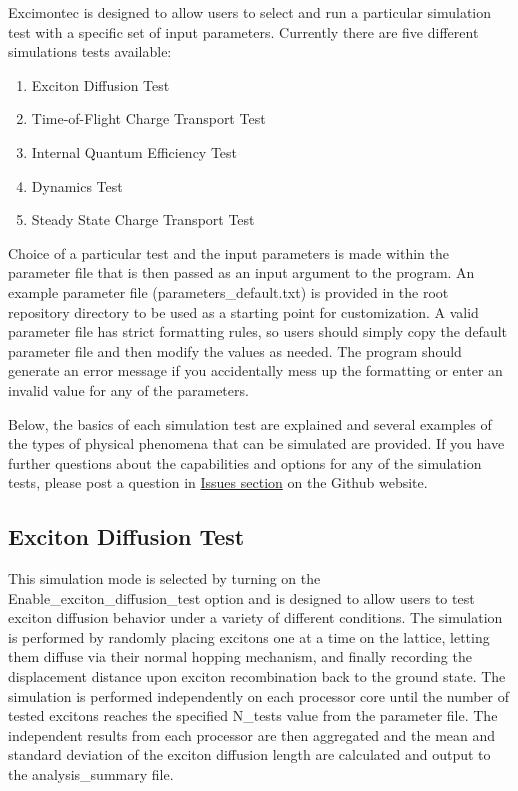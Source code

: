 \documentclass[%
 reprint,onecolumn,notitlepage,
superscriptaddress,longbibliography,
 amsmath,amssymb,
 aps,rmp,floatfix,
]{revtex4-1}
\begin{document}
Excimontec is designed to allow users to select and run a particular simulation test with a specific set of input parameters.
Currently there are five different simulations tests available:
\begin{enumerate}
    \item Exciton Diffusion Test
    \item Time-of-Flight Charge Transport Test
    \item Internal Quantum Efficiency Test
    \item Dynamics Test
    \item Steady State Charge Transport Test
\end{enumerate}
Choice of a particular test and the input parameters is made within the parameter file that is then passed as an input argument to the program.
An example parameter file (parameters\_default.txt) is provided in the root repository directory to be used as a starting point for customization.
A valid parameter file has strict formatting rules, so users should simply copy the default parameter file and then modify the values as needed.
The program should generate an error message if you accidentally mess up the formatting or enter an invalid value for any of the parameters.

Below, the basics of each simulation test are explained and several examples of the types of physical phenomena that can be simulated are provided.
If you have further questions about the capabilities and options for any of the simulation tests, please post a question in \href{https://github.com/MikeHeiber/Excimontec/issues}{Issues section} on the Github website.

\subsection{Exciton Diffusion Test}

This simulation mode is selected by turning on the Enable\_exciton\_diffusion\_test option and is designed to allow users to test exciton diffusion behavior under a variety of different conditions.
The simulation is performed by randomly placing excitons one at a time on the lattice, letting them diffuse via their normal hopping mechanism, and finally recording the displacement distance upon exciton recombination back to the ground state.
The simulation is performed independently on each processor core until the number of tested excitons reaches the specified N\_tests value from the parameter file.
The independent results from each processor are then aggregated and the mean and standard deviation of the exciton diffusion length are calculated and output to the analysis\_summary file.
\end{document}
